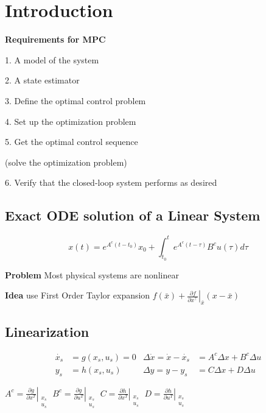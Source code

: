 \section{Introduction}

\textbf{Requirements for MPC}

1. A model of the system

2. A state estimator

3. Define the optimal control problem

4. Set up the optimization problem

5. Get the optimal control sequence

(solve the optimization problem)

6. Verify that the closed-loop system performs as desired


\subsection{Exact ODE solution of a Linear System}

\[
	x(t) = e^{A^c(t-t_0)}x_0 +
	\textstyle\int_{t_0}^{t}e^{A^c(t-\tau)}B^c u(\tau)d\tau
\]

\textbf{Problem} Most physical systems are nonlinear

\textbf{Idea} use First Order Taylor expansion
$f(\bar{x}) + \left. \frac{\partial f}{\partial x^\top} \right
	\rvert_{\bar{x}} (x-\bar{x})$

\subsection{Linearization}


\[\begin{aligned}
		\dot{x_s} & =g(x_s,u_s) = 0
		          & \Delta \dot{x}  =\dot{x} -\dot{x_s}
		          & = A^c\Delta x + B^c\Delta u
		\\
		y_s       & = h(x_s,u_s)
		          & \Delta y        = y - y_s
		          & = C\Delta x + D\Delta u
	\end{aligned} \]


$A^c= \left.\frac{\partial g}{\partial x^T}\right|_{\substack{x_s \\u_s}} $
$B^c= \left.\frac{\partial g}{\partial u^T}\right|_{\substack{x_s \\u_s}} $
$C= \left.\frac{\partial h}{\partial x^T}\right|_{\substack{x_s \\u_s}} $
$D= \left.\frac{\partial h}{\partial u^T}\right|_{\substack{x_s \\u_s}} $

